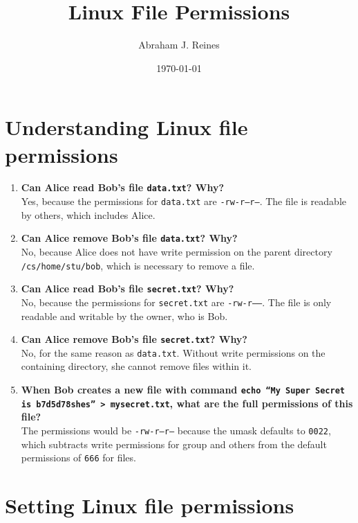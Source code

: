 \documentclass{article}
\title{Linux File Permissions}
\author{Abraham J. Reines}
\date{\today}
\begin{document}
\maketitle


\section*{Understanding Linux file permissions}

\begin{enumerate}
    \item \textbf{Can Alice read Bob's file \texttt{data.txt}? Why?}\\
    Yes, because the permissions for \texttt{data.txt} are \texttt{-rw-r--r--}. The file is readable by others, which includes Alice.
    
    \item \textbf{Can Alice remove Bob's file \texttt{data.txt}? Why?}\\
    No, because Alice does not have write permission on the parent directory \texttt{/cs/home/stu/bob}, which is necessary to remove a file.
    
    \item \textbf{Can Alice read Bob's file \texttt{secret.txt}? Why?}\\
    No, because the permissions for \texttt{secret.txt} are \texttt{-rw-r------}. The file is only readable and writable by the owner, who is Bob.
    
    \item \textbf{Can Alice remove Bob's file \texttt{secret.txt}? Why?}\\
    No, for the same reason as \texttt{data.txt}. Without write permissions on the containing directory, she cannot remove files within it.
    
    \item \textbf{When Bob creates a new file with command \texttt{echo “My Super Secret is b7d5d78shes” > mysecret.txt}, what are the full permissions of this file?}\\
    The permissions would be \texttt{-rw-r--r--} because the umask defaults to \texttt{0022}, which subtracts write permissions for group and others from the default permissions of \texttt{666} for files.
\end{enumerate}

\section*{Setting Linux file permissions}
\end{document}
